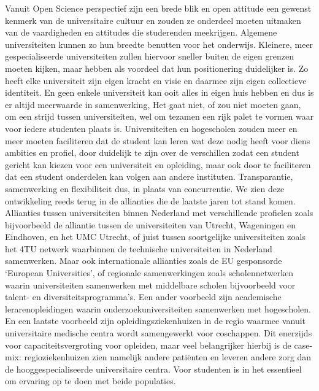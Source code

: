 \documentclass{jote-book}
\begin{document}
	Vanuit Open Science perspectief zijn een brede blik en open attitude een gewenst kenmerk van de universitaire cultuur en zouden ze onderdeel moeten uitmaken van de vaardigheden en attitudes die studerenden meekrijgen. Algemene universiteiten kunnen zo hun breedte benutten voor het onderwijs. Kleinere, meer gespecialiseerde universiteiten zullen hiervoor sneller buiten de eigen grenzen moeten kijken, maar hebben als voordeel dat hun positionering duidelijker is. Zo heeft elke universiteit zijn eigen kracht en visie en daarmee zijn eigen collectieve identiteit. En geen enkele universiteit kan ooit alles in eigen huis hebben en dus is er altijd meerwaarde in samenwerking, Het gaat niet, of zou niet moeten gaan, om een strijd tussen universiteiten, wel om tezamen een rijk palet te vormen waar voor iedere studenten plaats is. Universiteiten en hogescholen zouden meer en meer moeten faciliteren dat de student kan leren wat deze nodig heeft voor diens ambities en profiel, door duidelijk te zijn over de verschillen zodat een student gericht kan kiezen voor een universiteit en opleiding, maar ook door te faciliteren dat een student onderdelen kan volgen aan andere instituten. Transparantie, samenwerking en flexibiliteit dus, in plaats van concurrentie. We zien deze ontwikkeling reeds terug in de allianties die de laatste jaren tot stand komen. Allianties tussen universiteiten binnen Nederland met verschillende profielen zoals bijvoorbeeld de alliantie tussen de universiteiten van Utrecht, Wageningen en Eindhoven, en het UMC Utrecht, of juist tussen soortgelijke universiteiten zoals het 4TU netwerk waarbinnen de technische universiteiten in Nederland samenwerken. Maar ook internationale allianties zoals de EU gesponsorde ‘European Universities', of regionale samenwerkingen zoals scholennetwerken waarin universiteiten samenwerken met middelbare scholen bijvoorbeeld voor talent- en diversiteitsprogramma's. Een ander voorbeeld zijn academische lerarenopleidingen waarin onderzoekuniversiteiten samenwerken met hogescholen. En een laatste voorbeeld zijn opleidingsziekenhuizen in de regio waarmee vanuit universitaire medische centra wordt samengewerkt voor coschappen. Dit enerzijds voor capaciteitsvergroting voor opleiden, maar veel belangrijker hierbij is de case-mix: regioziekenhuizen zien namelijk andere patiënten en leveren andere zorg dan de hooggespecialiseerde universitaire centra. Voor studenten is in het essentieel om ervaring op te doen met beide populaties.
\end{document}
